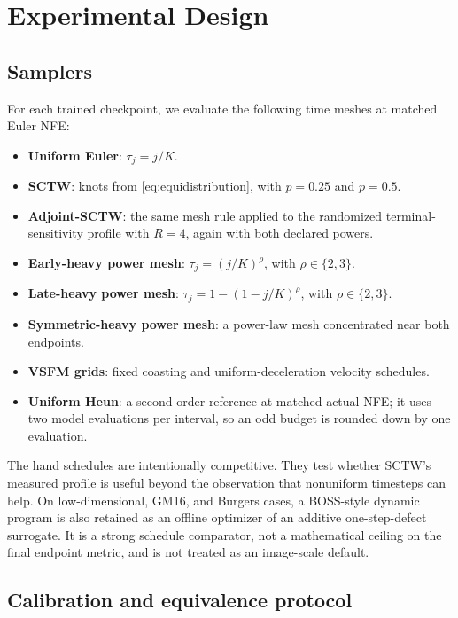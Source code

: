 \section{Experimental Design}
\label{sec:experiments}

\subsection{Samplers}
\label{sec:samplers}

For each trained checkpoint, we evaluate the following time meshes at matched Euler NFE:
\begin{itemize}
  \item \textbf{Uniform Euler}: $\tau_j=j/K$.
  \item \textbf{SCTW}: knots from \cref{eq:equidistribution}, with $p=0.25$ and $p=0.5$.
  \item \textbf{Adjoint-SCTW}: the same mesh rule applied to the randomized terminal-sensitivity
  profile with $R=4$, again with both declared powers.
  \item \textbf{Early-heavy power mesh}: $\tau_j=(j/K)^\rho$, with $\rho \in \{2,3\}$.
  \item \textbf{Late-heavy power mesh}: $\tau_j=1-(1-j/K)^\rho$, with $\rho \in \{2,3\}$.
  \item \textbf{Symmetric-heavy power mesh}: a power-law mesh concentrated near both endpoints.
  \item \textbf{VSFM grids}: fixed coasting and uniform-deceleration velocity schedules.
  \item \textbf{Uniform Heun}: a second-order reference at matched actual NFE; it uses two model
  evaluations per interval, so an odd budget is rounded down by one evaluation.
\end{itemize}
The hand schedules are intentionally competitive. They test whether SCTW's measured profile is
useful beyond the observation that nonuniform timesteps can help. On low-dimensional, GM16, and
Burgers cases, a BOSS-style dynamic program \citep{shaul2024bespoke,shaul2024bns} is also retained as an offline optimizer of an
additive one-step-defect surrogate. It is a strong schedule comparator, not a mathematical ceiling
on the final endpoint metric, and is not treated as an image-scale default.

\subsection{Calibration and equivalence protocol}
\label{sec:calibration-protocol}

